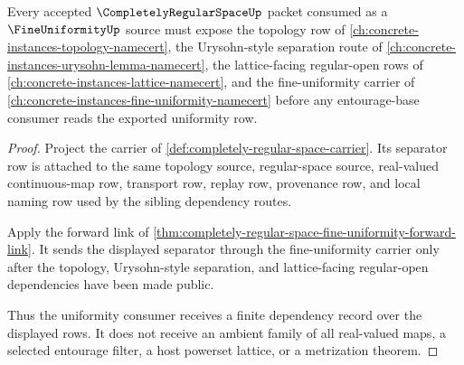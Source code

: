 \begin{theorem}
\label{thm:completely-regular-space-fine-uniformity-dependency-record}
Every accepted $\CompletelyRegularSpaceUp$ packet consumed as a $\FineUniformityUp$ source must expose the topology row of \autoref{ch:concrete-instances-topology-namecert}, the Urysohn-style separation route of \autoref{ch:concrete-instances-urysohn-lemma-namecert}, the lattice-facing regular-open rows of \autoref{ch:concrete-instances-lattice-namecert}, and the fine-uniformity carrier of \autoref{ch:concrete-instances-fine-uniformity-namecert} before any entourage-base consumer reads the exported uniformity row.
\end{theorem}
\begin{proof}
Project the carrier of \autoref{def:completely-regular-space-carrier}. Its separator row is attached to the same topology source, regular-space source, real-valued continuous-map row, transport row, replay row, provenance row, and local naming row used by the sibling dependency routes.

Apply the forward link of \autoref{thm:completely-regular-space-fine-uniformity-forward-link}. It sends the displayed separator through the fine-uniformity carrier only after the topology, Urysohn-style separation, and lattice-facing regular-open dependencies have been made public.

Thus the uniformity consumer receives a finite dependency record over the displayed rows. It does not receive an ambient family of all real-valued maps, a selected entourage filter, a host powerset lattice, or a metrization theorem.
\end{proof}
